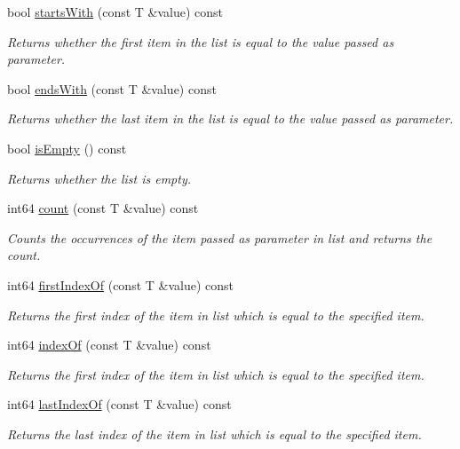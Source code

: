 \begin{DoxyCompactItemize}
bool \mbox{\hyperlink{class_a_list_ac6b1d6dabb7177aa465019860aeacba1}{starts\+With}} (const T \&value) const
\begin{DoxyCompactList}\small\item\em Returns whether the first item in the list is equal to the value passed as parameter. \end{DoxyCompactList}\item 
bool \mbox{\hyperlink{class_a_list_af6383e2209b2baa7c0e602b82d586cf9}{ends\+With}} (const T \&value) const
\begin{DoxyCompactList}\small\item\em Returns whether the last item in the list is equal to the value passed as parameter. \end{DoxyCompactList}\item 
bool \mbox{\hyperlink{class_a_list_ab0c4bd9783b1a181471e05f9fda79138}{is\+Empty}} () const
\begin{DoxyCompactList}\small\item\em Returns whether the list is empty. \end{DoxyCompactList}\item 
int64 \mbox{\hyperlink{class_a_list_a4769f724fc264fae0cd1ebbc6f70ec2e}{count}} (const T \&value) const
\begin{DoxyCompactList}\small\item\em Counts the occurrences of the item passed as parameter in list and returns the count. \end{DoxyCompactList}\item 
int64 \mbox{\hyperlink{class_a_list_af785e824aa6822fa079fd146fdfbda8e}{first\+Index\+Of}} (const T \&value) const
\begin{DoxyCompactList}\small\item\em Returns the first index of the item in list which is equal to the specified item. \end{DoxyCompactList}\item 
int64 \mbox{\hyperlink{class_a_list_a4b097672b446185673cf1ec2df799110}{index\+Of}} (const T \&value) const
\begin{DoxyCompactList}\small\item\em Returns the first index of the item in list which is equal to the specified item. \end{DoxyCompactList}\item 
int64 \mbox{\hyperlink{class_a_list_a6e83dd4da23beeda52e15e8a2cc9f799}{last\+Index\+Of}} (const T \&value) const
\begin{DoxyCompactList}\small\item\em Returns the last index of the item in list which is equal to the specified item. \end{DoxyCompactList}\item 

\end{DoxyCompactItemize}
